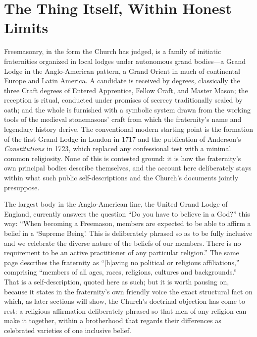 \section{The Thing Itself, Within Honest Limits}

Freemasonry, in the form the Church has judged, is a family of initiatic fraternities organized in local lodges under autonomous grand bodies---a Grand Lodge in the Anglo-American pattern, a Grand Orient in much of continental Europe and Latin America. A candidate is received by degrees, classically the three Craft degrees of Entered Apprentice, Fellow Craft, and Master Mason; the reception is ritual, conducted under promises of secrecy traditionally sealed by oath; and the whole is furnished with a symbolic system drawn from the working tools of the medieval stonemasons' craft from which the fraternity's name and legendary history derive. The conventional modern starting point is the formation of the first Grand Lodge in London in 1717 and the publication of Anderson's \emph{Constitutions} in 1723, which replaced any confessional test with a minimal common religiosity. None of this is contested ground: it is how the fraternity's own principal bodies describe themselves, and the account here deliberately stays within what such public self-descriptions and the Church's documents jointly presuppose.

The largest body in the Anglo-American line, the United Grand Lodge of England, currently answers the question ``Do you have to believe in a God?'' this way: ``When becoming a Freemason, members are expected to be able to affirm a belief in a `Supreme Being'. This is deliberately phrased so as to be fully inclusive and we celebrate the diverse nature of the beliefs of our members. There is no requirement to be an active practitioner of any particular religion.'' The same page describes the fraternity as ``[h]aving no political or religious affiliations,'' comprising ``members of all ages, races, religions, cultures and backgrounds.'' That is a self-description, quoted here as such; but it is worth pausing on, because it states in the fraternity's own friendly voice the exact structural fact on which, as later sections will show, the Church's doctrinal objection has come to rest: a religious affirmation deliberately phrased so that men of any religion can make it together, within a brotherhood that regards their differences as celebrated varieties of one inclusive belief.

